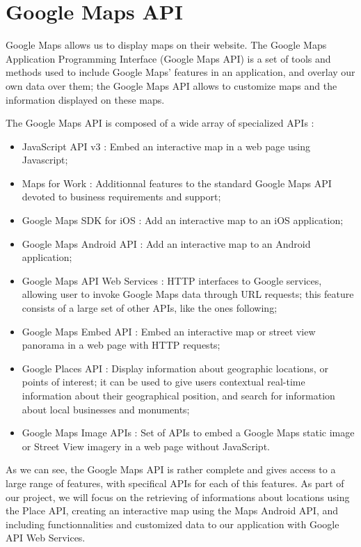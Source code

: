 \section{Google Maps API}

Google Maps allows us to display maps on their website. The Google Maps Application Programming Interface (Google Maps API) is a set of tools and methods used to include Google Maps' features in an application, and overlay our own data over them; the Google Maps API allows to customize maps and the information displayed on these maps.

The Google Maps API is composed of a wide array of specialized APIs :

\begin{itemize}
	\item JavaScript API v3 : Embed an interactive map in a web page using Javascript;
	\item Maps for Work : Additionnal features to the standard Google Maps API devoted to business requirements and support;
 	\item Google Maps SDK for iOS : Add an interactive map to an iOS application;
  \item Google Maps Android API : Add an interactive map to an Android application;
	\item Google Maps API Web Services : HTTP interfaces to Google services, allowing user to invoke Google Maps data through URL requests; this feature consists of a large set of other APIs, like the ones following;
	\item Google Maps Embed API : Embed an interactive map or street view panorama in a web page with HTTP requests;
 	\item Google Places API : Display information about geographic locations, or points of interest; it can be used to give users contextual real-time information about their geographical position, and search for information about local businesses and monuments;
 	\item Google Maps Image APIs : Set of APIs to embed a Google Maps static image or Street View imagery in a web page without JavaScript.
\end{itemize}

As we can see, the Google Maps API is rather complete and gives access to a large range of features, with specifical APIs for each of this features. As part of our project, we will focus on the retrieving of informations about locations using the Place API, creating an interactive map using the Maps Android API, and including functionnalities and customized data to our application with Google API Web Services.

